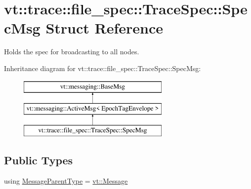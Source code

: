 \hypertarget{structvt_1_1trace_1_1file__spec_1_1_trace_spec_1_1_spec_msg}{}\section{vt\+:\+:trace\+:\+:file\+\_\+spec\+:\+:Trace\+Spec\+:\+:Spec\+Msg Struct Reference}
\label{structvt_1_1trace_1_1file__spec_1_1_trace_spec_1_1_spec_msg}


Holds the spec for broadcasting to all nodes.  


Inheritance diagram for vt\+:\+:trace\+:\+:file\+\_\+spec\+:\+:Trace\+Spec\+:\+:Spec\+Msg\+:\begin{figure}[H]
\begin{center}
\leavevmode
\includegraphics[height=3.000000cm]{structvt_1_1trace_1_1file__spec_1_1_trace_spec_1_1_spec_msg}
\end{center}
\end{figure}
\subsection*{Public Types}
\begin{DoxyCompactItemize}
\item 
using \hyperlink{structvt_1_1trace_1_1file__spec_1_1_trace_spec_1_1_spec_msg_a743bf5ad18160e1488e22c35d5cc3da5}{Message\+Parent\+Type} = \hyperlink{namespacevt_a3a3ddfef40b4c90915fa43cdd5f129ea}{vt\+::\+Message}
\end{DoxyCompactItemize}
